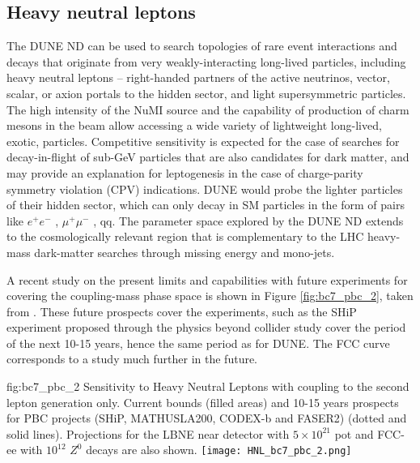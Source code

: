 \subsection{Heavy neutral leptons}
 The DUNE ND can be used to search topologies of rare event interactions and decays that originate
 from very weakly-interacting long-lived particles, including heavy neutral leptons -- right-handed
 partners of the active neutrinos, vector, scalar, or axion portals to the hidden sector, and light
 supersymmetric particles. The high intensity of the NuMI source and the capability of production
 of charm mesons in the beam allow accessing a wide variety of lightweight long-lived, exotic,
 particles. Competitive sensitivity is expected for the case of searches for decay-in-flight of sub-GeV
 particles that are also candidates for dark matter, and may provide an explanation for leptogenesis
 in the case of charge-parity symmetry violation (CPV) indications. DUNE would probe the lighter
 particles of their hidden sector, which can only decay in SM particles in the form of pairs like $e^+e^-$ ,
 $\mu^+\mu^-$ , qq. The parameter space explored by the DUNE ND extends to the cosmologically relevant
region that is complementary to the LHC heavy-mass dark-matter searches through missing energy
 and mono-jets. 

A recent study on the present limits  and capabilities with future experiments for covering the coupling-mass phase space 
is shown in Figure \ref{fig:bc7_pbc_2}, taken from \cite{Beacham:2019nyx}. These future prospects  cover the experiments, such as the SHiP experiment
 proposed
through the  physics beyond collider study cover the period of the next 10-15 years, hence the same period as for DUNE. The FCC 
curve corresponds to a study much further in the future.

\begin{dunefigure}{fig:bc7_pbc_2}
    {Sensitivity to Heavy Neutral Leptons with coupling to the second lepton generation only.
    Current bounds (filled areas) and 10-15 years prospects for PBC projects (SHiP, MATHUSLA200, CODEX-b and FASER2) (dotted and solid lines).
    Projections for the LBNE near detector with $5 \times 10^{21}$ pot and  FCC-ee with $10^{12}$ $Z^0$
    decays are also shown.}
  \texttt{[image: HNL\_bc7\_pbc\_2.png]}
\end{dunefigure}


